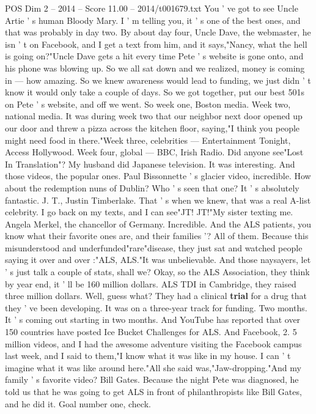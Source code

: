 \begin{textsample}{POS Dim 2 – 2014 – Score 11.00 – 2014/t001679.txt}
You ' ve got to see Uncle Artie ' s human Bloody Mary.
I ' m telling you, it ' s one of the best ones, and that was probably in day two.
By about day four, Uncle Dave, the webmaster, he isn ' t on Facebook, and I get a text from him, and it says,"Nancy, what the hell is going on?"Uncle Dave gets a hit every time Pete ' s website is gone onto, and his phone was blowing up.
So we all sat down and we realized, money is coming in — how amazing.
So we knew awareness would lead to funding, we just didn ' t know it would only take a couple of days.
So we got together, put our best 501s on Pete ' s website, and off we went.
So week one, Boston media.
Week two, national media.
It was during week two that our neighbor next door opened up our door and threw a pizza across the kitchen floor, saying,"I think you people might need food in there."Week three, celebrities — Entertainment Tonight, Access Hollywood.
Week four, global — BBC, Irish Radio.
Did anyone see"Lost In Translation"?
My husband did Japanese television.
It was interesting.
And those videos, the popular ones.
Paul Bissonnette ' s glacier video, incredible.
How about the redemption nuns of Dublin?
Who ' s seen that one?
It ' s absolutely fantastic.
J.
T., Justin Timberlake.
That ' s when we knew, that was a real A-list celebrity.
I go back on my texts, and I can see"JT!
JT!"My sister texting me.
Angela Merkel, the chancellor of Germany.
Incredible.
And the ALS patients, you know what their favorite ones are, and their families '?
All of them.
Because this misunderstood and underfunded"rare"disease, they just sat and watched people saying it over and over :"ALS, ALS."It was unbelievable.
And those naysayers, let ' s just talk a couple of stats, shall we?
Okay, so the ALS Association, they think by year end, it ' ll be 160 million dollars.
ALS TDI in Cambridge, they raised three million dollars.
Well, guess what?
They had a clinical \textbf{trial} for a drug that they ' ve been developing.
It was on a three-year track for funding.
Two months.
It ' s coming out starting in two months.
And YouTube has reported that over 150 countries have posted Ice Bucket Challenges for ALS.
And Facebook, 2. 5 million videos, and I had the awesome adventure visiting the Facebook campus last week, and I said to them,"I know what it was like in my house.
I can ' t imagine what it was like around here."All she said was,"Jaw-dropping."And my family ' s favorite video?
Bill Gates.
Because the night Pete was diagnosed, he told us that he was going to get ALS in front of philanthropists like Bill Gates, and he did it.
Goal number one, check.

\end{textsample}
